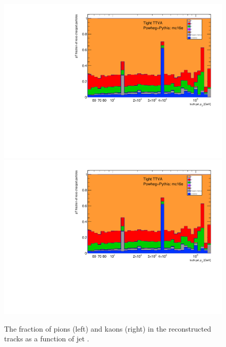 \begin{figure}
\centering
\includegraphics[scale=0.3, page=4]{figures/jet_comp_study_powheg_Tight_pTFraction_mc16e.pdf}
\includegraphics[scale=0.3, page=5]{figures/jet_comp_study_powheg_Tight_pTFraction_mc16e.pdf}
\caption {The fraction of pions (left) and kaons (right) in the reconstructed tracks as a function of jet \pT.}
\label{fig:fraction pions and kaons}
\end{figure}


